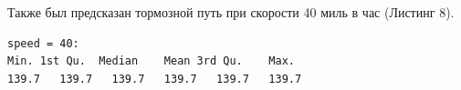 \documentclass[]{article}
\numberwithin{equation}{section}
\begin{document}
    Также был предсказан тормозной путь при скорости 40 миль в час (Листинг 8).

    \begin{lstlisting}[style = TEXTstyle, caption = Предсказание тормозного пути при скорости 40 м/ч]
speed = 40:
Min. 1st Qu.  Median    Mean 3rd Qu.    Max.
139.7   139.7   139.7   139.7   139.7   139.7
    \end{lstlisting}
\end{document}
